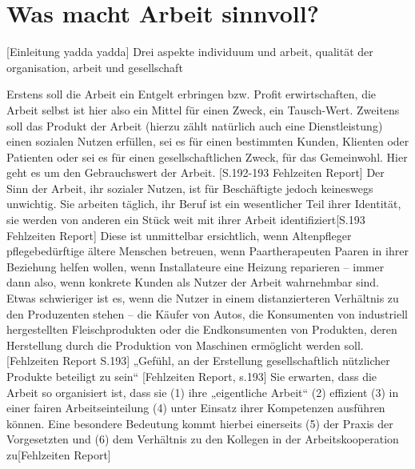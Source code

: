 \chapter{Was macht Arbeit sinnvoll?}
[Einleitung yadda yadda]
Drei aspekte individuum und arbeit, qualität der organisation, arbeit und gesellschaft

Erstens soll die Arbeit ein Entgelt erbringen bzw. Profit erwirtschaften, die Arbeit selbst ist hier also ein Mittel für einen Zweck, ein Tausch-Wert. Zweitens soll das Produkt der Arbeit (hierzu zählt natürlich auch eine Dienstleistung) einen sozialen Nutzen erfüllen, sei es für einen bestimmten Kunden, Klienten oder Patienten oder sei es für einen gesellschaftlichen Zweck, für das Gemeinwohl. Hier geht es um den Gebrauchswert der Arbeit. [S.192-193 Fehlzeiten Report]
Der Sinn der Arbeit, ihr sozialer Nutzen, ist für Beschäftigte jedoch keineswegs unwichtig. Sie arbeiten täglich, ihr Beruf ist ein wesentlicher Teil ihrer Identität, sie werden von anderen ein Stück weit mit ihrer Arbeit identifiziert[S.193 Fehlzeiten Report]
Diese ist unmittelbar ersichtlich, wenn Altenpfleger pflegebedürftige ältere Menschen betreuen, wenn Paartherapeuten Paaren in ihrer Beziehung helfen wollen, wenn Installateure eine Heizung reparieren – immer dann also, wenn konkrete Kunden als Nutzer der Arbeit wahrnehmbar sind. Etwas schwieriger ist es, wenn die Nutzer in einem distanzierteren Verhältnis zu den Produzenten stehen – die Käufer von Autos, die Konsumenten von industriell hergestellten Fleischprodukten oder die Endkonsumenten von Produkten, deren Herstellung durch die Produktion von Maschinen ermöglicht werden soll.[Fehlzeiten Report S.193]
„Gefühl, an der Erstellung gesellschaftlich nützlicher Produkte beteiligt zu sein“ [Fehlzeiten Report, s.193]
Sie erwarten, dass die Arbeit so organisiert ist, dass sie (1) ihre „eigentliche Arbeit“ (2) effizient (3) in einer fairen Arbeitseinteilung (4) unter Einsatz ihrer Kompetenzen ausführen können. Eine besondere Bedeutung kommt hierbei einerseits (5) der Praxis der Vorgesetzten und (6) dem Verhältnis zu den Kollegen in der Arbeitskooperation zu[Fehlzeiten Report]



